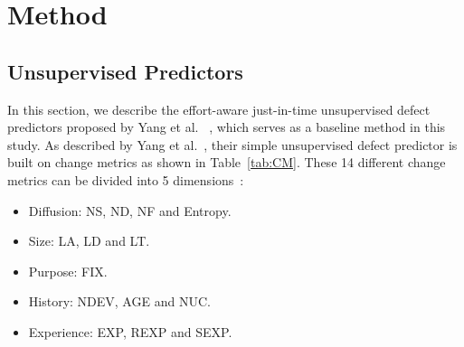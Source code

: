 \documentclass[sigconf]{acmart}
\theoremstyle{break}
\newcommand{\bi}{\begin{itemize}[leftmargin=0.4cm]}
\newcommand{\ei}{\end{itemize}}
\newcommand{\tab}[1]{Table~\ref{tab:#1}}
\begin{document}
\section{Method}\label{method}



\subsection{Unsupervised Predictors} \label{unsupervised}
In this section, we describe the effort-aware 
just-in-time unsupervised defect predictors proposed by Yang et al. ~\cite{yang2016effort},
which serves as a baseline method in this study. As described by Yang et al.~\cite{yang2016effort},  their simple unsupervised
 defect predictor is built on change metrics as shown in \tab{CM}. These
 14 different change metrics can be divided into 5 dimensions~\cite{kamei2013large}:
 
 \bi
 \item Diffusion: NS, ND, NF and Entropy.
 \item Size: LA, LD and LT.
 \item Purpose: FIX.
 \item History: NDEV, AGE and NUC.
 \item Experience: EXP, REXP and SEXP.
 \ei 
\end{document}
